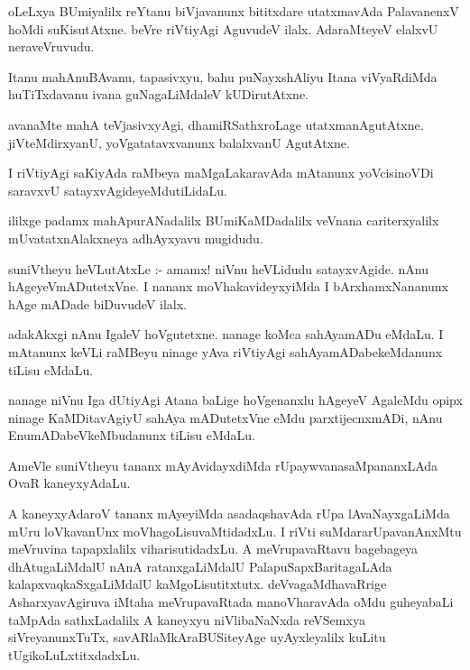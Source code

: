 \documentclass{article}
\begin{document}
\begin{mn}
oLeLxya BUmiyalilx reYtanu biVjavanunx bititxdare utatxmavAda PalavanenxV hoMdi 
suKisutAtxne.  beVre riVtiyAgi AguvudeV ilalx. AdaraMteyeV elalxvU neraveVruvudu.
\end{mn}

\begin{mn}
Itanu mahAnuBAvanu,  tapasivxyu,  bahu puNayxshAliyu Itana viVyaRdiMda 
huTiTxdavanu ivana guNagaLiMdaleV kUDirutAtxne.
\end{mn}

\begin{mn}
avanaMte mahA teVjasivxyAgi, dhamiRSathxroLage utatxmanAgutAtxne.  
jiVteMdirxyanU, yoVgatatavxvanunx balalxvanU AgutAtxne.
\end{mn}

\begin{mn}
I riVtiyAgi saKiyAda  raMbeya maMgaLakaravAda mAtanunx yoVcisinoVDi saravxvU satayxvAgideyeMdutiLidaLu.
\end{mn}

\begin{mn}
ililxge padamx mahApurANadalilx BUmiKaMDadalilx veVnana cariterxyalilx mUvatatxnAlakxneya adhAyxyavu mugidudu.
\end{mn}




\begin{mn}
suniVtheyu heVLutAtxLe :- amamx! niVnu heVLidudu satayxvAgide. nAnu hAgeyeVmADutetxVne.  
I nananx moVhakavideyxyiMda I bArxhamxNananunx hAge mADade biDuvudeV ilalx.
\end{mn}

\begin{mn}
adakAkxgi nAnu IgaleV hoVgutetxne.  nanage koMca sahAyamADu eMdaLu.  I mAtanunx keVLi  
raMBeyu ninage yAva riVtiyAgi sahAyamADabekeMdanunx tiLisu eMdaLu.
\end{mn}

\begin{mn}
nanage niVnu Iga dUtiyAgi Atana baLige hoVgenanxlu hAgeyeV AgaleMdu opipx ninage 
KaMDitavAgiyU sahAya mADutetxVne eMdu parxtijecnxmADi, nAnu EnumADabeVkeMbudanunx tiLisu eMdaLu.
\end{mn}

\begin{mn}
AmeVle suniVtheyu tananx mAyAvidayxdiMda rUpaywvanasaMpananxLAda OvaR kaneyxyAdaLu.
\end{mn}

\begin{mn}
A kaneyxyAdaroV tananx mAyeyiMda asadaqshavAda rUpa lAvaNayxgaLiMda mUru loVkavanUnx 
moVhagoLisuvaMtidadxLu.  I riVti suMdararUpavanAnxMtu meVruvina tapapxlalilx viharisutidadxLu.  
A meVrupavaRtavu bagebageya dhAtugaLiMdalU nAnA ratanxgaLiMdalU  PalapuSapxBaritagaLAda 
kalapxvaqkaSxgaLiMdalU kaMgoLisutitxtutx. deVvagaMdhavaRrige AsharxyavAgiruva iMtaha 
meVrupavaRtada manoVharavAda oMdu guheyabaLi taMpAda sathxLadalilx A kaneyxyu niVlibaNaNxda 
reVSemxya siVreyanunxTuTx,  savARlaMkAraBUSiteyAge uyAyxleyalilx kuLitu tUgikoLuLxtitxdadxLu.
\end{mn}
\end{document}
